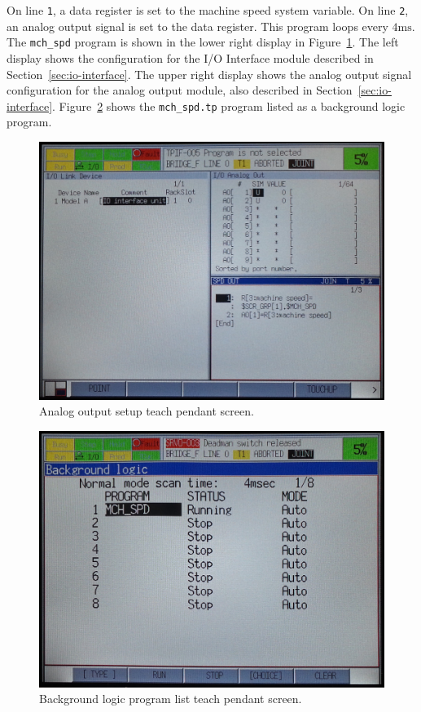 

On line \verb|1|, a data register is set to the machine speed system variable. On line \verb|2|, an analog output signal is set to the data register. This program loops every \(4\si{\milli\second}\). The \verb|mch_spd| program is shown in the lower right display in Figure~\ref{fig:ao-setup}. The left display shows the configuration\cite[sec~3.5.1]{lr-handling-tool} for the I/O Interface module described in Section~\ref{sec:io-interface}. The upper right display shows the analog output signal configuration\cite[sec~3.1.3]{lr-handling-tool} for the analog output module, also described in Section~\ref{sec:io-interface}. Figure~\ref{fig:bg-logic} shows the \verb|mch_spd.tp| program listed as a background logic program.

\begin{figure}
    \centering
    \includegraphics[width=.8\linewidth]{figures/tp-screens/ao-setup}
    \caption{Analog output setup teach pendant screen.}
    \label{fig:ao-setup}
\end{figure}

\begin{figure}
    \centering
    \includegraphics[width=.8\linewidth]{figures/tp-screens/bg-logic}
    \caption{Background logic program list teach pendant screen.}
    \label{fig:bg-logic}
\end{figure}
